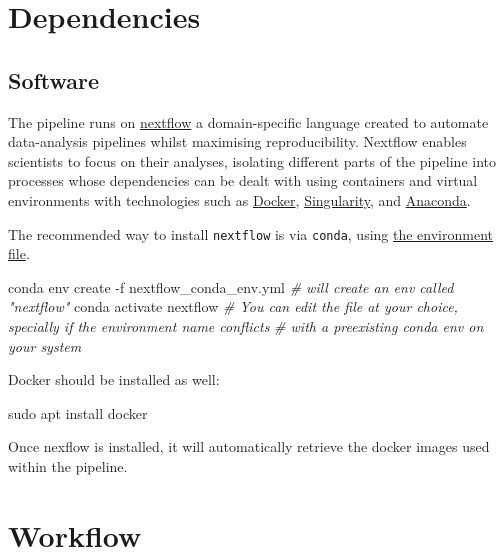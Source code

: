 \documentclass[
  openany]{book}
\newenvironment{Shaded}{\begin{snugshade}}{\end{snugshade}}
\newcommand{\AttributeTok}[1]{\textcolor[rgb]{0.77,0.63,0.00}{#1}}
\newcommand{\CommentTok}[1]{\textcolor[rgb]{0.56,0.35,0.01}{\textit{#1}}}
\newcommand{\ExtensionTok}[1]{#1}
\newcommand{\FunctionTok}[1]{\textcolor[rgb]{0.00,0.00,0.00}{#1}}
\newcommand{\NormalTok}[1]{#1}
\begin{document}
\hypertarget{dependencies}{%
\chapter{Dependencies}\label{dependencies}}

\hypertarget{software}{%
\section{Software}\label{software}}

The pipeline runs on \href{https://www.nextflow.io/}{nextflow} a domain-specific language created to automate data-analysis pipelines whilst maximising reproducibility.
Nextflow enables scientists to focus on their analyses, isolating different parts of the pipeline into processes whose dependencies can be dealt with using containers and virtual environments with technologies such as \href{https://www.docker.com/}{Docker}, \href{https://singularity.hpcng.org/}{Singularity}, and \href{https://www.anaconda.com/products/individual}{Anaconda}.

The recommended way to install \texttt{nextflow} is via \texttt{conda}, using \href{https://github.com/bio-TAGI/Hackathon/blob/main/nextflow_conda_env.yml}{the environment file}.

\begin{Shaded}
\begin{Highlighting}[]
\ExtensionTok{conda}\NormalTok{ env create }\AttributeTok{{-}f}\NormalTok{ nextflow\_conda\_env.yml }\CommentTok{\# will create an env called "nextflow"}
\ExtensionTok{conda}\NormalTok{ activate nextflow}
\CommentTok{\# You can edit the file at your choice, specially if the environment name conflicts}
\CommentTok{\# with a preexisting conda env on your system}
\end{Highlighting}
\end{Shaded}

Docker should be installed as well:

\begin{Shaded}
\begin{Highlighting}[]
\FunctionTok{sudo}\NormalTok{ apt install docker}
\end{Highlighting}
\end{Shaded}

Once nexflow is installed, it will automatically retrieve the docker images used within the pipeline.

\hypertarget{workflow}{%
\chapter{Workflow}\label{workflow}}
\end{document}
